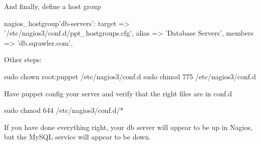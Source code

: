 And finally, define a host group

nagios_hostgroup{'db-servers':
              target => '/etc/nagios3/conf.d/ppt_hostgroups.cfg',
              alias => 'Database Servers',
              members => 'db.sqrawler.com',
  }



Other steps:

sudo chown root:puppet /etc/nagios3/conf.d
sudo chmod 775 /etc/nagios3/conf.d 

Have puppet config your server and verify that the right files are in conf.d

sudo chmod 644 /etc/nagios3/conf.d/* 

If you have done everything right, your db server will appear to be up in Nagios,
but the MySQL service will appear to be down.


